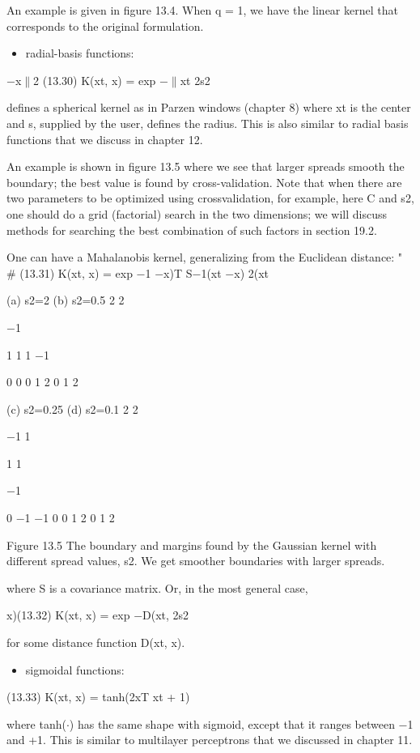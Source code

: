 An example is given in figure 13.4. When q = 1, we have the linear kernel that corresponds to the original formulation.

\begin{itemize}
\item radial-basis functions:
\end{itemize}

$-$x$\parallel$2 (13.30) K(xt, x) = exp $-$$\parallel$xt 2s2

defines a spherical kernel as in Parzen windows (chapter 8) where xt is the center and s, supplied by the user, defines the radius. This is also similar to radial basis functions that we discuss in chapter 12.

An example is shown in figure 13.5 where we see that larger spreads smooth the boundary; the best value is found by cross-validation. Note that when there are two parameters to be optimized using crossvalidation, for example, here C and s2, one should do a grid (factorial) search in the two dimensions; we will discuss methods for searching the best combination of such factors in section 19.2.

One can have a Mahalanobis kernel, generalizing from the Euclidean distance: " \# (13.31) K(xt, x) = exp $-$1 $-$x)T S$-$1(xt $-$x) 2(xt

(a) s2=2 (b) s2=0.5 2 2

$-$1

1 1 1 $-$1

0 0 0 1 2 0 1 2

(c) s2=0.25 (d) s2=0.1 2 2

$-$1 1

1 1

$-$1

0 $-$1 $-$1 0 0 1 2 0 1 2

Figure 13.5 The boundary and margins found by the Gaussian kernel with different spread values, s2. We get smoother boundaries with larger spreads.

where S is a covariance matrix. Or, in the most general case,

x)(13.32) K(xt, x) = exp $-$D(xt, 2s2

for some distance function D(xt, x).

\begin{itemize}
\item sigmoidal functions:
\end{itemize}

(13.33) K(xt, x) = tanh(2xT xt + 1)

where tanh($\cdot$) has the same shape with sigmoid, except that it ranges between $-$1 and +1. This is similar to multilayer perceptrons that we discussed in chapter 11.


